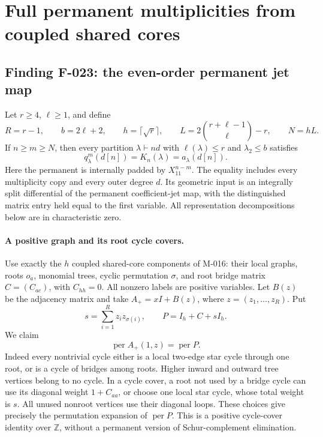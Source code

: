 \section{Full permanent multiplicities from coupled shared cores}

\subsection*{Finding F-023: the even-order permanent jet map}
Let \(r\geq4\), \(\ell\geq1\), and define
\[
 R=r-1,\qquad b=2\ell+2,\qquad h=\lceil\sqrt r\rceil,
 \qquad L=2\binom{r+\ell-1}{\ell}-r,\qquad N=hL.
\]
If \(n\geq m\geq N\), then every partition
\(\lambda\vdash nd\) with \(\ell(\lambda)\leq r\)
and \(\lambda_2\leq b\) satisfies
\begin{equation}\label{eq:F023full}
           q^m_\lambda(d[n])=K_n(\lambda)=a_\lambda(d[n]).
\end{equation}
Here the permanent is internally padded by
\(X_{11}^{n-m}\). The equality includes every multiplicity
copy and every outer degree \(d\). Its geometric input is an
integrally split differential of the permanent coefficient-jet
map, with the distinguished matrix entry held equal to the
first variable. All representation decompositions below are
in characteristic zero.

\paragraph{A positive graph and its root cycle covers.}
Use exactly the \(h\) coupled shared-core components of
M-016: their local graphs, roots \(o_a\), monomial trees,
cyclic permutation \(\sigma\), and root bridge matrix
\(C=(C_{ac})\), with \(C_{hh}=0\). All nonzero labels
are positive variables. Let \(B(z)\) be the adjacency
matrix and take \(A_+=xI+B(z)\), where
\(z=(z_1,\ldots,z_R)\). Put
\[
 s=\sum_{i=1}^R z_i z_{\sigma(i)},\qquad
                       P=I_h+C+sI_h.
                                                               \tag{F-023.1}
\]
We claim
\[
                      \operatorname{per}A_+(1,z)
                                  =\operatorname{per}P.
                                                               \tag{F-023.2}
\]
Indeed every nontrivial cycle either is a local two-edge
star cycle through one root, or is a cycle of bridges among
roots. Higher inward and outward tree vertices belong to
no cycle. In a cycle cover, a root not used by a bridge
cycle can use its diagonal weight \(1+C_{aa}\), or choose
one local star cycle, whose total weight is \(s\).
All unused nonroot vertices use their diagonal loops.
These choices give precisely the permutation expansion of
\(\operatorname{per}P\). This is a positive cycle-cover
identity over \(\mathbb Z\), without a permanent version
of Schur-complement elimination.

